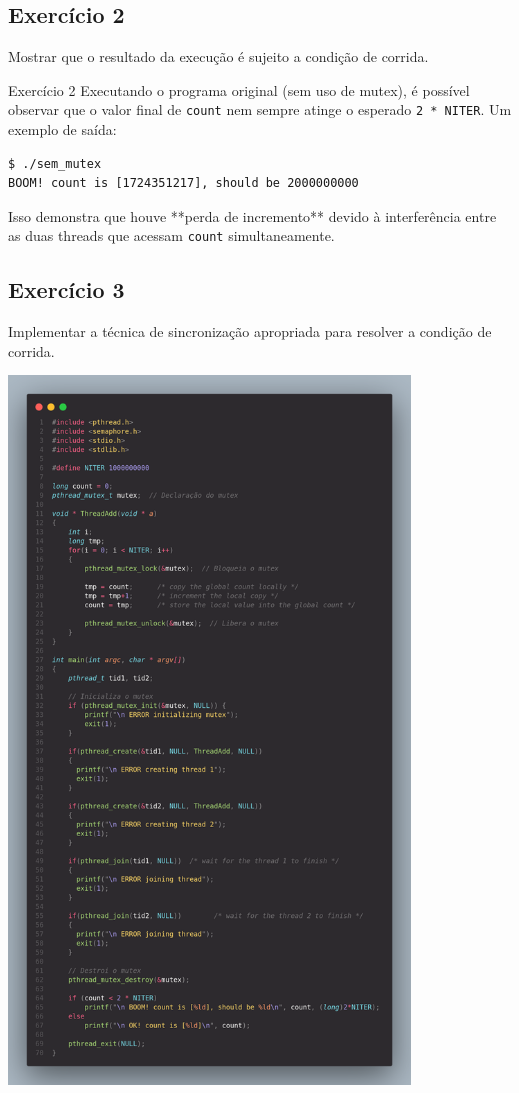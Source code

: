 \documentclass[14pt,a4paper]{article}
\begin{document}
\subsection*{Exercício 2}
Mostrar que o resultado da execução é sujeito a condição de corrida.

\begin{solucao}{Exercício 2}{}
Executando o programa original (sem uso de mutex), é possível observar que o valor final de \texttt{count} nem sempre atinge o esperado \texttt{2 * NITER}. Um exemplo de saída:

\begin{verbatim}
$ ./sem_mutex
BOOM! count is [1724351217], should be 2000000000
\end{verbatim}

Isso demonstra que houve **perda de incremento** devido à interferência entre as duas threads que acessam \texttt{count} simultaneamente.
\end{solucao}

\newpage

\subsection*{Exercício 3}
Implementar a técnica de sincronização apropriada para resolver a condição de corrida.

\begin{center}
        \includegraphics[width=0.8\textwidth]{code.png}
    \end{center}
\end{document}
